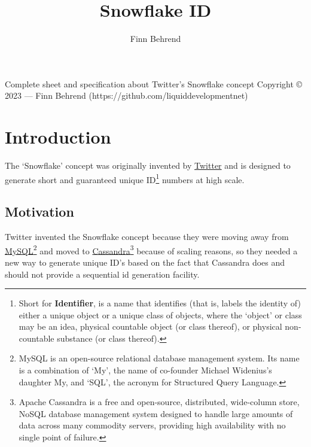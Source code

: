\documentclass{article}
\title{\textbf{Snowflake ID}}
\author{Finn Behrend}
\begin{document}
\begin{titlingpage}
    \maketitle
    \begin{center}
        \vspace{50px}
        Complete sheet and specification about Twitter's Snowflake concept
        \vfill
        \footnotesize{Copyright \copyright{} 2023 --- Finn Behrend
            (https://github.com/liquiddevelopmentnet)}
    \end{center}
\end{titlingpage}

\tableofcontents

\pagebreak

\section{Introduction}
The `Snowflake' concept was originally invented by
\href{https://twitter.com}{Twitter} and is designed to generate short and
guaranteed unique ID\footnote{Short for \textbf{Identifier},  is a name
    that
    identifies (that is, labels the identity of) either a unique object or
    a
    unique
    class of objects, where the `object' or class may be an idea, physical
    countable object (or class thereof), or physical non-countable
    substance
    (or
    class thereof).} numbers at high scale.

\subsection{Motivation}
Twitter invented the Snowflake concept because they were moving away from
\href{https://en.wikipedia.org/wiki/MySQL}{MySQL}\footnote{MySQL is an
    open-source relational database management system. Its name is a
    combination of
    `My', the name of co-founder Michael Widenius's daughter My, and `SQL', the
    acronym for Structured Query Language.} and moved to
\href{https://en.wikipedia.org/wiki/Cassandra}{Cassandra}\footnote{Apache
    Cassandra is
    a free and open-source, distributed, wide-column store, NoSQL database
    management system designed to handle large amounts of data across many
    commodity servers, providing high availability with no single point of
    failure.} because of scaling
reasons, so they needed a new way to generate unique ID's based on the fact
that Cassandra does and should not provide a sequential id generation facility.
\end{document}
